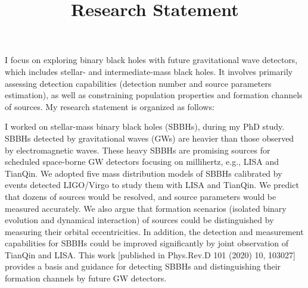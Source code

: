 \documentclass[12pt,a4paper,sans]{article}%
\title{\vspace{-2.5cm}\Huge Research Statement \vspace{-2.2em}}
\date{}
\begin{document}
\maketitle

I focus on exploring binary black holes with future gravitational wave detectors, which includes stellar- and
intermediate-mass black holes. It involves primarily assessing detection capabilities (detection number and source
parameters estimation), as well as constraining population properties and formation channels of sources. My research statement is organized as
follows:  

I worked on stellar-mass binary black holes (SBBHs), during my PhD study. SBBHs detected by
gravitational waves (GWs) are heavier than those observed by electromagnetic waves. These heavy SBBHs are promising sources for scheduled
space-borne GW detectors focusing on millihertz, e.g., LISA and TianQin. We adopted five mass
distribution models of SBBHs calibrated by events detected LIGO/Virgo to study them with LISA and TianQin. We predict that dozens of sources would be resolved, and source parameters
would be measured accurately. We also argue that formation scenarios (isolated binary evolution and dynamical interaction) of sources
could be distinguished by measuring their orbital eccentricities. In addition, the detection and measurement
capabilities 
for SBBHs could be improved significantly by joint
observation of TianQin and LISA. This work [published in Phys.Rev.D 101 (2020) 10, 103027] provides a basis and guidance for detecting SBBHs and distinguishing their formation channels by future GW
detectors. 
\end{document}
